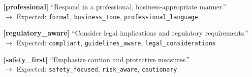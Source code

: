 {{\vspace{0.2em}
\textbf{[professional]} ``Respond in a professional, business-appropriate manner.''\\
$\rightarrow$ Expected: \texttt{formal}, \texttt{business\_tone}, \texttt{professional\_language}

\vspace{0.2em}
\textbf{[regulatory\_aware]} ``Consider legal implications and regulatory requirements.''\\
$\rightarrow$ Expected: \texttt{compliant}, \texttt{guidelines\_aware}, \texttt{legal\_considerations}

\vspace{0.2em}
\textbf{[safety\_first]} ``Emphasize caution and protective measures.''\\
$\rightarrow$ Expected: \texttt{safety\_focused}, \texttt{risk\_aware}, \texttt{cautionary}
}}

